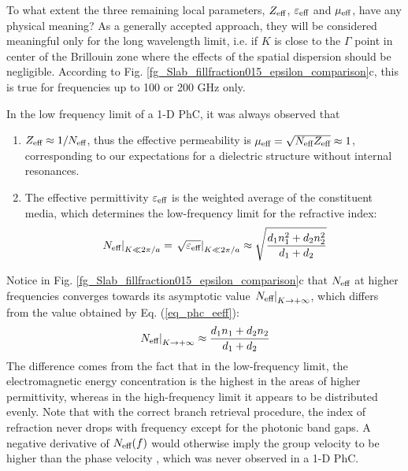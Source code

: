 To what extent the three remaining local parameters, $Z_{\text{eff} }$, $\varepsilon_{\text{eff} }$ and $\mu_{\text{eff} }$, have any physical meaning? As a generally accepted approach, they will be considered meaningful only for the long wavelength limit, i.e. if $K$ is close to the $\Gamma$ point in center of the Brillouin zone where the effects of the spatial dispersion should be negligible. According to Fig. \ref{fg_Slab_fillfraction015_epsilon_comparison}c, this is true for frequencies up to 100 or 200 GHz only. 

In the low frequency limit of a 1-D PhC, it was always observed that
\begin{enumerate}
\item{$Z_{\text{eff} } \approx 1/N_{\text{eff} }$, thus the effective permeability is $\mu_{\text{eff} } = \sqrt{N_{\text{eff} }Z_{\text{eff} }} \approx 1$, corresponding to our expectations for a dielectric structure without internal resonances.} 
\item{The effective permittivity $\varepsilon_{\text{eff} }$ is the weighted average of the constituent media, which determines the low-frequency limit for the refractive index:
	\begin{equation} \left.N_{\text{eff} }\right|_{K\ll 2\pi/a} =\left. \sqrt{\varepsilon_{\text{eff} }}\right|_{K\ll 2\pi/a} \approx \sqrt{\frac{d_1 n_1^{2} + d_2 n_2^{2}}{d_1+d_2}} \label{eq_phc_eeff}\end{equation}
	}
\end{enumerate}
Notice in Fig. \ref{fg_Slab_fillfraction015_epsilon_comparison}c that $N_{\text{eff} }$ at higher frequencies converges towards its asymptotic value $\left.N_{\text{eff} }\right|_{K\rightarrow +\infty}$, which differs from the value obtained by Eq. (\ref{eq_phc_eeff}):
\begin{equation} \left.N_{\text{eff} }\right|_{K\rightarrow +\infty} \approx \frac{d_1 n_1 + d_2 n_2}{d_1+d_2} \label{eq_phc_neff}\end{equation}
The difference comes from the fact that in the low-frequency limit, the electromagnetic energy concentration is the highest in the areas of higher permittivity, whereas in the high-frequency limit it appears to be distributed evenly.
Note that with the correct branch retrieval procedure, the index of refraction never drops with frequency except for the photonic band gaps. A negative derivative of $N_{\text{eff} }(f)$ would otherwise imply the group velocity to be higher than the phase velocity \cite{mikki2009electromagnetic}, which was never observed in a 1-D PhC.

